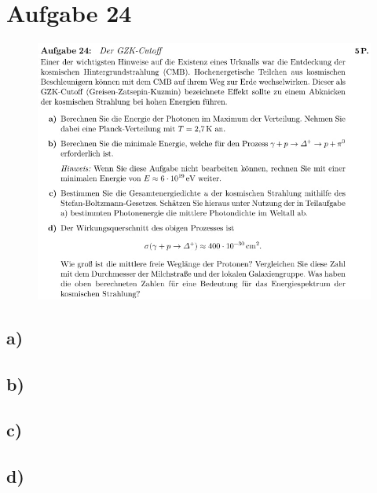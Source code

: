 \section{Aufgabe 24}

    \begin{figure}[H]
        \centering
        \includegraphics[width=\textwidth]{images/Aufgabe24.jpg}
        \label{fig:5}
    \end{figure}

\subsection{a)}

\subsection{b)}

\subsection{c)}

\subsection{d)}

